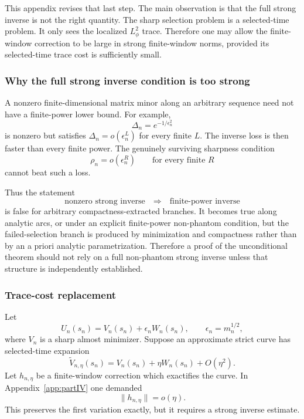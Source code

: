 \documentclass[11pt]{article}
\numberwithin{equation}{section}
\theoremstyle{plain}
\theoremstyle{definition}
\theoremstyle{remark}
\begin{document}
This appendix revises that last step.  The main observation is that the full strong inverse is not the right quantity.  The sharp selection problem is a selected-time problem.  It only sees the localized \(L^2_\phi\) trace.  Therefore one may allow the finite-window correction to be large in strong finite-window norms, provided its selected-time trace cost is sufficiently small.

\subsubsection{Why the full strong inverse condition is too strong}

A nonzero finite-dimensional matrix minor along an arbitrary sequence need not have a finite-power lower bound.  For example,
\[
        \Delta_n=e^{-1/\epsilon_n^2}
\]
is nonzero but satisfies \(\Delta_n=o(\epsilon_n^L)\) for every finite \(L\).  The inverse loss is then faster than every finite power.  The genuinely surviving sharpness condition
\[
        \rho_n=o(\epsilon_n^R)
        \qquad\text{for every finite }R
\]
cannot beat such a loss.

Thus the statement
\[
        \text{nonzero strong inverse}
        \quad\Longrightarrow\quad
        \text{finite-power inverse}
\]
is false for arbitrary compactness-extracted branches.  It becomes true along analytic arcs, or under an explicit finite-power non-phantom condition, but the failed-selection branch is produced by minimization and compactness rather than by an a priori analytic parametrization.  Therefore a proof of the unconditional theorem should not rely on a full non-phantom strong inverse unless that structure is independently established.

\subsubsection{Trace-cost replacement}

Let
\[
        U_n(s_n)=V_n(s_n)+\epsilon_nW_n(s_n),
        \qquad
        \epsilon_n=m_n^{1/2},
\]
where \(V_n\) is a sharp almost minimizer.  Suppose an approximate strict curve has selected-time expansion
\[
        \widetilde V_{n,\eta}(s_n)=V_n(s_n)+\eta W_n(s_n)+O(\eta^2).
\]
Let \(h_{n,\eta}\) be a finite-window correction which exactifies the curve.  In Appendix~\ref{app:partIV} one demanded
\[
        \|h_{n,\eta}\|=o(\eta).
\]
This preserves the first variation exactly, but it requires a strong inverse estimate.
\end{document}
